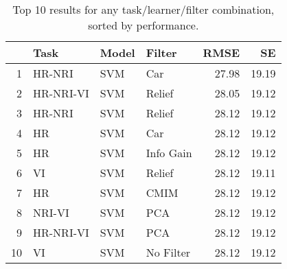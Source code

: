 \begin{table}[ht!]
\centering
\caption{Top 10 results for any task/learner/filter combination, sorted by performance.} 
\label{tab:perf-top-10}
\begin{tabular}{rlllrr}
  \hline
 & Task & Model & Filter & RMSE & SE \\ 
  \hline
1 & HR-NRI & SVM & Car & 27.98 & 19.19 \\ 
  2 & HR-NRI-VI & SVM & Relief & 28.05 & 19.12 \\ 
  3 & HR-NRI & SVM & Relief & 28.12 & 19.12 \\ 
  4 & HR & SVM & Car & 28.12 & 19.12 \\ 
  5 & HR & SVM & Info Gain & 28.12 & 19.12 \\ 
  6 & VI & SVM & Relief & 28.12 & 19.11 \\ 
  7 & HR & SVM & CMIM & 28.12 & 19.12 \\ 
  8 & NRI-VI & SVM & PCA & 28.12 & 19.12 \\ 
  9 & HR-NRI-VI & SVM & PCA & 28.12 & 19.12 \\ 
  10 & VI & SVM & No Filter & 28.12 & 19.12 \\ 
   \hline
\end{tabular}
\end{table}
